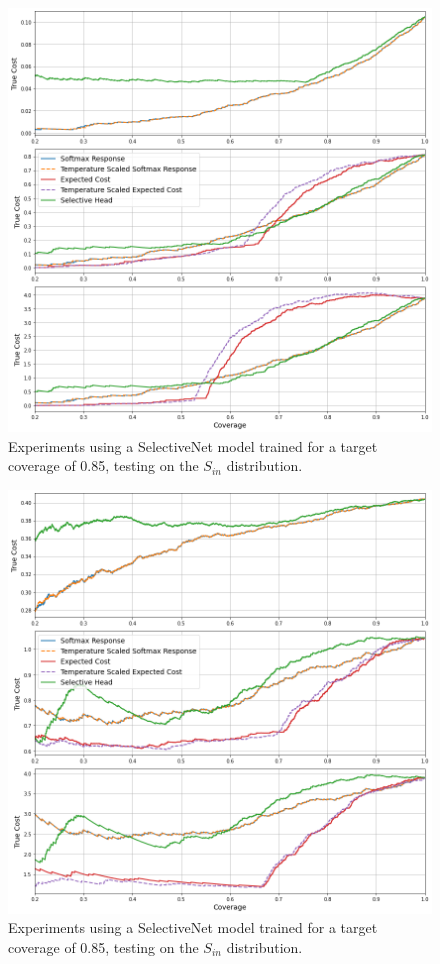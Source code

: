 \begin{figure}[H]
	\includegraphics[width=\textwidth]{images/binary/sn0.85_in_distribution.png}
	\caption*{Experiments using a SelectiveNet model trained for a target coverage of 0.85, testing on the $S_{in}$ distribution.}
\end{figure}

\begin{figure}[H]
	\includegraphics[width=\textwidth]{images/binary/sn0.85_out_distribution.png}
	\caption*{Experiments using a SelectiveNet model trained for a target coverage of 0.85, testing on the $S_{in}$ distribution.}
\end{figure}

